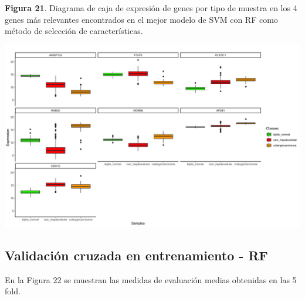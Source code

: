 \newpage
\begin{center}
\textbf{Figura 21}. Diagrama de caja de expresión de genes por tipo de muestra en los 4 genes más relevantes encontrados en el mejor modelo de SVM con RF como método de selección de características.
\end{center}
\begin{center}
	\includegraphics[width=1\textwidth]{figuras/21_higado_multiclase_14_svm_boxplots_mejor_metodo.png} 
\end{center}

\newpage
\subsection{Validación cruzada en entrenamiento - RF}

En la Figura 22 se muestran las medidas de evaluación medias obtenidas en las 5 fold.\\

